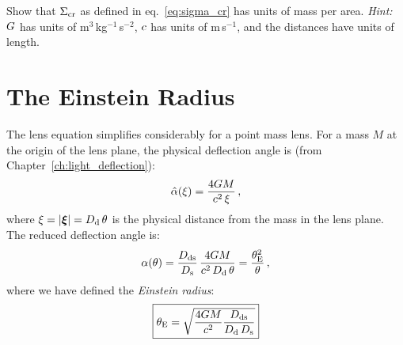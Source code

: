 \begin{exercise}
\label{ex:sigma_cr_units}
Show that $\Sigma_{\mathrm{cr}}$ as defined in eq.~\eqref{eq:sigma_cr} has units
of mass per area.  \textit{Hint:} $G$ has units of
m$^3$\,kg$^{-1}$\,s$^{-2}$, $c$ has units of m\,s$^{-1}$,
and the distances have units of length.
\end{exercise}


\section{The Einstein Radius}
\label{sec:einstein_radius}

The lens equation simplifies considerably for a point mass lens.
For a mass $M$ at the origin of the lens plane, the physical deflection
angle is (from Chapter~\ref{ch:light_deflection}):
\begin{equation}
    \hat{\alpha}(\xi) = \frac{4G M}{c^2\, \xi} \,,
    \label{eq:alphahat_point}
\end{equation}
where $\xi = |\boldsymbol{\xi}| = D_{\mathrm{d}}\,\theta$ is the physical distance from the
mass in the lens plane.  The reduced deflection angle is:
\begin{equation}
    \alpha(\theta) = \frac{D_{\mathrm{ds}}}{D_{\mathrm{s}}}\,
    \frac{4G M}{c^2\, D_{\mathrm{d}}\,\theta}
    = \frac{\theta_{\mathrm{E}}^2}{\theta} \,,
    \label{eq:alpha_point}
\end{equation}
where we have defined the \emph{Einstein radius}:
\begin{equation}
    \boxed{
    \theta_{\mathrm{E}} = \sqrt{\frac{4G M}{c^2}
    \frac{D_{\mathrm{ds}}}{D_{\mathrm{d}}\, D_{\mathrm{s}}}}
    }
    \label{eq:einstein_radius}
\end{equation}

